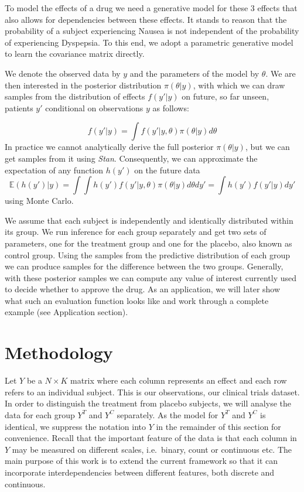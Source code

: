 \documentclass[11pt]{article}
\begin{document}
To model the effects of a drug we need a generative model for these 3
effects that also allows for dependencies between these effects. It
stands to reason that the probability of a subject experiencing Nausea
is not independent of the probability of experiencing Dyspepsia. To this
end, we adopt a parametric generative model to learn the covariance
matrix directly.

We denote the observed data by \(y\) and the parameters of the model by
\(\theta\). We are then interested in the posterior distribution
\(\pi(\theta | y)\), with which we can draw samples from the
distribution of effects \(f(y'|y)\) on future, so far unseen, patients
\(y'\) conditional on observations \(y\) as follows:

\[
f(y'|y) = \int f(y'|y,\theta) \pi(\theta|y) d\theta
\] In practice we cannot analytically derive the full posterior
\(\pi(\theta | y)\), but we can get samples from it using \emph{Stan}.
Consequently, we can approximate the expectation of any function
\(h(y')\) on the future data \[
\mathbb{E} (h (y') | y) = \int \int h(y') f(y'|y,\theta) \pi(\theta|y) d\theta dy' = \int h(y') f(y'|y) dy'
\] using Monte Carlo.

We assume that each subject is independently and identically distributed
within its group. We run inference for each group separately and get two
sets of parameters, one for the treatment group and one for the placebo,
also known as control group. Using the samples from the predictive
distribution of each group we can produce samples for the difference
between the two groups. Generally, with these posterior samples we can
compute any value of interest currently used to decide whether to
approve the drug. As an application, we will later show what such an
evaluation function looks like and work through a complete example (see
Application section).

\hypertarget{methodology}{%
\section{Methodology}\label{methodology}}

Let \(Y\) be a \(N\times K\) matrix where each column represents an
effect and each row refers to an individual subject. This is our
observations, our clinical trials dataset. In order to distinguish the
treatment from placebo subjects, we will analyse the data for each group
\(Y^T\) and \(Y^{C}\) separately. As the model for \(Y^T\) and \(Y^{C}\)
is identical, we suppress the notation into \(Y\) in the remainder of
this section for convenience. Recall that the important feature of the
data is that each column in \(Y\) may be measured on different scales,
i.e.~binary, count or continuous etc. The main purpose of this work is
to extend the current framework so that it can incorporate
interdependencies between different features, both discrete and
continuous.
\end{document}
